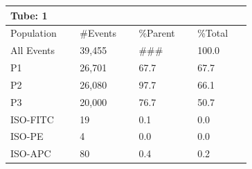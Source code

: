 \documentclass[UTF8,10pt,a4paper,fontset=fandol]{ctexart}
\newcommand{\fieldvalue}[1]{#1}
\begin{document}
\begin{center}
\small
\begin{tabular}{|p{0.18\linewidth}|p{0.17\linewidth}|p{0.17\linewidth}|p{0.17\linewidth}|}
\hline
\multicolumn{4}{|l|}{Tube: 
\fieldvalue{1}}\\
\hline
Population & \#Events & \%Parent & \%Total\\
\hline
All Events &
\fieldvalue{39,455} &
\fieldvalue{\#\#\#} &
\fieldvalue{100.0}\\
\hline
P1 &
\fieldvalue{26,701} &
\fieldvalue{67.7} &
\fieldvalue{67.7}\\
\hline
P2 &
\fieldvalue{26,080} &
\fieldvalue{97.7} &
\fieldvalue{66.1}\\
\hline
P3 &
\fieldvalue{20,000} &
\fieldvalue{76.7} &
\fieldvalue{50.7}\\
\hline
ISO-FITC &
\fieldvalue{19} &
\fieldvalue{0.1} &
\fieldvalue{0.0}\\
\hline
ISO-PE &
\fieldvalue{4} &
\fieldvalue{0.0} &
\fieldvalue{0.0}\\
\hline
ISO-APC &
\fieldvalue{80} &
\fieldvalue{0.4} &
\fieldvalue{0.2}\\
\hline
\end{tabular}
\end{center}
\end{document}

